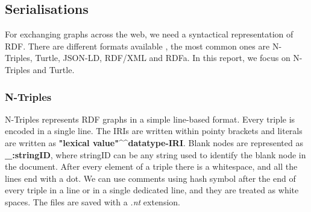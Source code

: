 

\subsection{Serialisations}
For exchanging graphs across the web, we need a syntactical representation of RDF. There are different formats available \cite{W3C2011}, the most common ones are N-Triples, Turtle, JSON-LD, RDF/XML and RDFa. In this report, we focus on N-Triples and Turtle.

\subsubsection{N-Triples}
N-Triples \cite{Beckett} represents RDF graphs in a simple line-based format. Every triple is encoded in a single line. The IRIs are written within pointy brackets and literals are written as \textbf{"lexical value"\textasciicircum \textasciicircum datatype-IRI}. Blank nodes are represented as \textbf{\_:stringID}, where stringID can be any string used to identify the blank node in the document. After every element of a triple there is a whitespace, and all the lines end with a dot. We can use comments using hash symbol after the end of every triple in a line or in a single dedicated line, and they are treated as white spaces. The files are saved with a \textit{.nt} extension.

